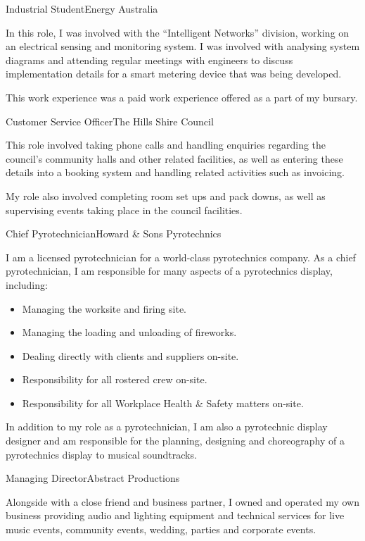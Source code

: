 \documentclass[10pt]{article}
\begin{document}
\begin{professionalExperience}
{Industrial Student}{Energy Australia}
{In this role, I was involved with the ``Intelligent Networks'' division, 
working on an electrical sensing and monitoring system. I was involved with 
analysing system diagrams and attending regular meetings with engineers to 
discuss implementation details for a smart metering device that was being 
developed.

This work experience was a paid work experience offered as a part of my 
 bursary.}
{}

{Customer Service Officer}{The Hills Shire Council}
{This role involved taking phone calls and handling enquiries regarding the 
council's community halls and other related facilities, as well as entering 
these details into a booking system and handling related activities such as 
invoicing.

My role also involved completing room set ups and pack downs, as well as 
supervising events taking place in the council facilities.}
{}

{Chief Pyrotechnician}{Howard \& Sons Pyrotechnics}
{I am a licensed pyrotechnician for a world-class pyrotechnics company. As a 
chief pyrotechnician, I am responsible for many aspects of a pyrotechnics 
display, including:
\begin{itemize}
	\item Managing the worksite and firing site.
	\item Managing the loading and unloading of fireworks.
	\item Dealing directly with clients and suppliers on-site.
	\item Responsibility for all rostered crew on-site.
	\item Responsibility for all Workplace Health \& Safety matters on-site.
\end{itemize}

In addition to my role as a pyrotechnician, I am also a pyrotechnic display 
designer and am responsible for the planning, designing and choreography of a 
pyrotechnics display to musical soundtracks.}
{}

{Managing Director}{Abstract Productions}
{Alongside with a close friend and business partner, I owned and operated my own
business providing audio and lighting equipment and technical services for live
music events, community events, wedding, parties and corporate events.

}
\end{professionalExperience}
\end{document}

